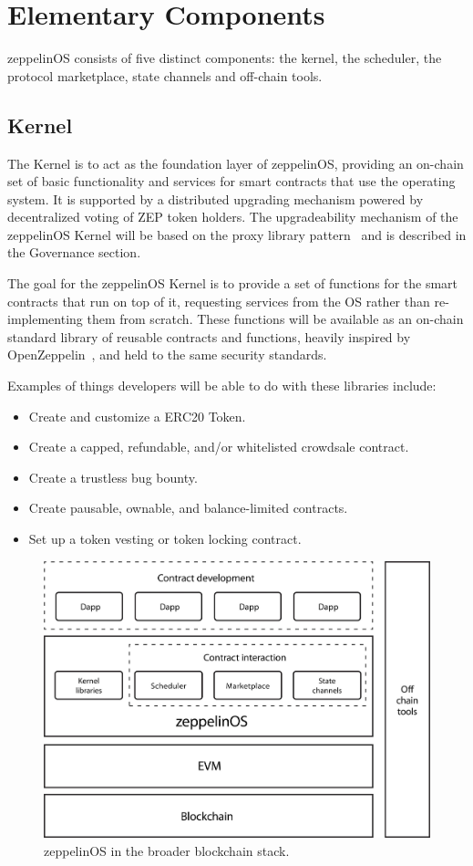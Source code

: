 \documentclass[]{article}
\makeatletter
\DeclareRobustCommand{\_}{%
  \leavevmode\vbox{%
    \hrule\@width.5em
          \@height-.26ex
          \@depth\dimexpr.26ex+.28pt\relax}}
\makeatother
\begin{document}
\section{Elementary Components}

zeppelinOS consists of five distinct components: the kernel, the
scheduler, the protocol marketplace, state channels and off-chain
tools.

\subsection{Kernel}

The Kernel is to act as the foundation layer of zeppelinOS, providing
an on-chain set of basic functionality and services for smart
contracts that use the operating system. It is supported by a distributed
upgrading mechanism powered by decentralized voting of ZEP token
holders. The upgradeability mechanism of the zeppelinOS Kernel will be
based on the proxy library pattern~\cite{proxylibs} and is described in
the Governance section.

The goal for the zeppelinOS Kernel is to provide a set of functions for
the smart contracts that run on top of it, requesting services from the
OS rather than re-implementing them from scratch. These functions will
be available as an on-chain standard library of reusable contracts and
functions, heavily inspired by OpenZeppelin~\cite{openzeppelin}, and held to the
same security standards.

Examples of things developers will be able to do with these libraries
include:

\begin{itemize}
\item
  {Create and customize a ERC20 Token.}
\item
  {Create a capped, refundable, and/or whitelisted crowdsale contract.}
\item
  {Create a trustless bug bounty.}
\item
  {Create pausable, ownable, and balance-limited contracts.}
\item
  {Set up a token vesting or token locking contract.}
\end{itemize}

\begin{figure}
  \centering
  \includegraphics[width=0.75\linewidth]{images/image6.jpg}

  \caption{zeppelinOS in the broader blockchain stack.}
\end{figure}
\end{document}
